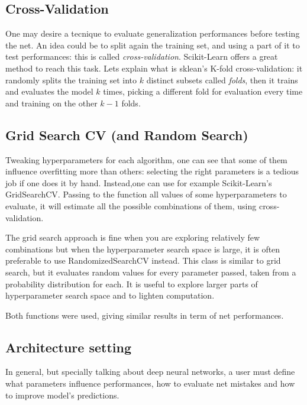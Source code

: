 \documentclass{article}
\begin{document}
\subsection{Cross-Validation}

One may desire a tecnique to evaluate generalization performances before testing the net. An idea could be to split again the training set, and using a part of it to test performances: this is called \textit{cross-validation}.
Scikit-Learn offers a great method to reach this task. Lets explain what is sklean's K-fold cross-validation: it randomly splits the training set into $k$ distinct subsets called \textit{folds}, then it trains and evaluates the model $k$ times, picking a different fold for evaluation every time and training on the other $k-1$ folds.


\subsection{Grid Search CV (and Random Search)}
Tweaking hyperparameters for each algorithm, one can see that some of them influence overfitting more than others: selecting the right parameters is a tedious job if one does it by hand.
Instead,one can use for example Scikit-Learn’s GridSearchCV. Passing to the function all values of some hyperparameters to evaluate, it will estimate all the possible combinations of them, using cross-validation. 

The grid search approach is fine when you are exploring relatively few combinations but when the hyperparameter search space is large, it is often preferable to use RandomizedSearchCV instead. This class is similar to grid search, but it evaluates random values for every parameter passed, taken from a probability distribution for each.
It is useful to explore larger parts of hyperparameter search space and to lighten computation.

Both functions were used, giving similar results in term of net performances.


\subsection{Architecture setting}
In general, but specially talking about deep neural networks, a user must define what parameters influence performances, how to evaluate net mistakes and how to improve model's predictions.
\end{document}
